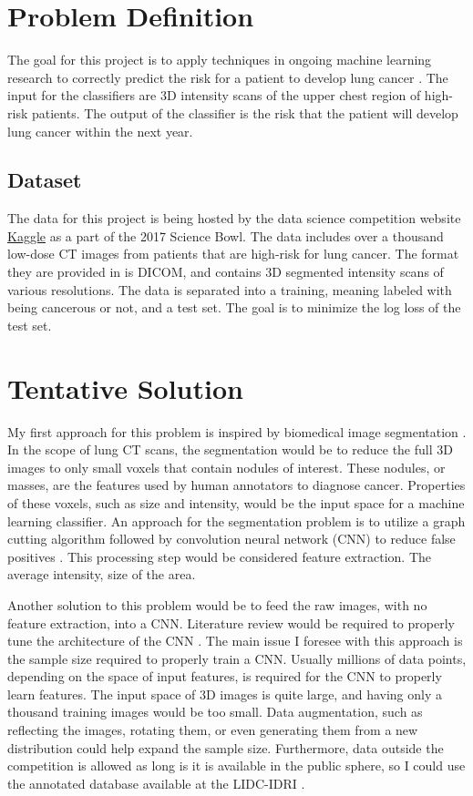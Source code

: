\documentclass[conference,11pt]{IEEEtran}
\begin{document}
\section{Problem Definition}

The goal for this project is to apply techniques in ongoing machine learning research to correctly predict the risk for a patient to develop lung cancer \cite{ronneberger_u-net:_2015}. The input for the classifiers are 3D intensity scans of the upper chest region of high-risk patients. The output of the classifier is the risk that the patient will develop lung cancer within the next year.

\subsection{Dataset}
The data for this project is being hosted by the data science competition website \href{https://www.kaggle.com/c/data-science-bowl-2017}{Kaggle} as a part of the 2017 Science Bowl. The data includes over a thousand low-dose CT images from patients that are high-risk for lung cancer. The format they are provided in is DICOM, and contains 3D segmented intensity scans of various resolutions. The data is separated into a training, meaning labeled with being cancerous or not, and a test set. The goal is to minimize the log loss of the test set.

\section{Tentative Solution}

My first approach for this problem is inspired by biomedical image segmentation \cite{ronneberger_u-net:_2015}. In the scope of  lung CT scans, the segmentation would be to reduce the full 3D images to only small voxels that contain nodules of interest. These nodules, or masses, are the features used by human annotators to diagnose cancer.  Properties of these voxels, such as size and intensity, would be the input space for a machine learning classifier. An approach for the segmentation problem is to utilize a graph cutting algorithm followed by convolution neural network (CNN) to reduce false positives \cite{sun_automatic_2017}. This processing step would be considered feature extraction. The average intensity, size of the area.

Another solution to this problem would be to feed the raw images, with no feature extraction, into a CNN. Literature review would be required to properly tune the architecture of the CNN \cite{litjens_survey_2017}. The main issue I foresee with this approach is the sample size required to properly train a CNN. Usually millions of data points, depending on the space of input features, is required for the CNN to properly learn features. The input space of 3D images is quite large, and having only a thousand training images would be too small. Data augmentation, such as reflecting the images, rotating them, or even generating them from a new distribution could help expand the sample size. Furthermore, data outside the competition is allowed as long is it is available in the public sphere, so I could use the annotated database available at the LIDC-IDRI \cite{armato_lung_2011}.
\end{document}
